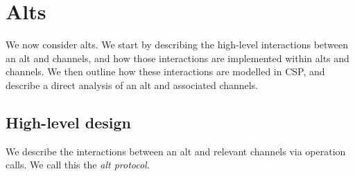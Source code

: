 \section{Alts}
\label{sec:alt}

\inlineScala

We now consider alts.  We start by describing the high-level interactions
between an alt and channels, and how those interactions are implemented within
alts and channels.  We then outline how these interactions are modelled in
CSP, and describe a direct analysis of an alt and associated channels.


\subsection{High-level design}

We describe the interactions between an alt and relevant channels via operation
calls.  We call this the \emph{alt protocol}. 

